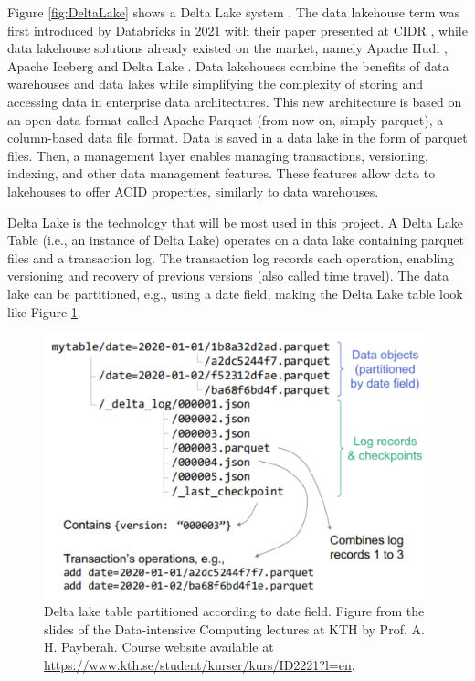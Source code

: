 Figure \ref{fig:DeltaLake} shows a Delta Lake system \cite{armbrustDeltaLakeHighperformance2020}. The data lakehouse term was first introduced by Databricks in 2021 with their paper presented at \gls{CIDR} \cite{lakehouse2021}, while data lakehouse solutions already existed on the market, namely Apache Hudi \cite{rajaperumalUberEngineeringIncremental2017}, Apache Iceberg and Delta Lake \cite{armbrustDeltaLakeHighperformance2020}. Data lakehouses combine the benefits of data warehouses and data lakes while simplifying the complexity of storing and accessing data in enterprise data architectures. This new architecture is based on an open-data format called Apache Parquet (from now on, simply parquet), a column-based data file format. Data is saved in a data lake in the form of parquet files. Then, a management layer enables managing transactions, versioning, indexing, and other data management features. These features allow data to lakehouses to offer \gls{ACID} properties, similarly to data warehouses. 

Delta Lake is the technology that will be most used in this project. A Delta Lake Table (i.e., an instance of Delta Lake) operates on a data lake containing parquet files and a transaction log. The transaction log records each operation, enabling versioning and recovery of previous versions (also called time travel). The data lake can be partitioned, e.g., using a date field, making the Delta Lake table look like Figure \ref{fig:delta_table}. 

\begin{figure}
    \begin{center}
      \includegraphics[width=\textwidth]{figures/2-background/delta_lake_table.png}
    \end{center}
    \caption[Delta lake partitioning]{Delta lake table partitioned according to date field. Figure from the slides of the Data-intensive Computing lectures at KTH by Prof. A. H. Payberah. Course website available at \url{https://www.kth.se/student/kurser/kurs/ID2221?l=en}.}
    \label{fig:delta_table}
\end{figure}


